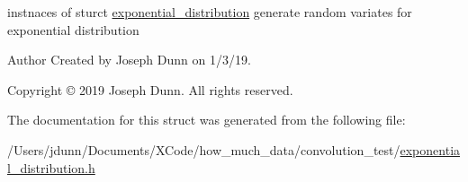 instnaces of sturct \mbox{\hyperlink{structexponential__distribution}{exponential\+\_\+distribution}} generate random variates for exponential distribution 

\begin{DoxyAuthor}{Author}
Created by Joseph Dunn on 1/3/19. 
\end{DoxyAuthor}
\begin{DoxyCopyright}{Copyright}
© 2019 Joseph Dunn. All rights reserved. 
\end{DoxyCopyright}


The documentation for this struct was generated from the following file\+:\begin{DoxyCompactItemize}
\item 
/\+Users/jdunn/\+Documents/\+X\+Code/how\+\_\+much\+\_\+data/convolution\+\_\+test/\mbox{\hyperlink{exponential__distribution_8h}{exponential\+\_\+distribution.\+h}}\end{DoxyCompactItemize}
